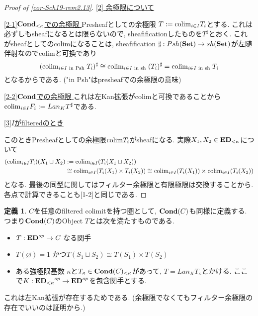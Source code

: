 \documentclass[dvipdfmx,a4paper,11pt]{report}
\newcommand{\colim}{{\rm colim}}
\theoremstyle{definition}
\newtheorem{dfn}[thm]{定義}
\begin{document}
\begin{proof}[Proof of \ref{cor-Sch19-rem2.13}]
\underline{ [2] 余極限について }

\underline{[2-1]${\bf Cond}_{< \kappa}$での余極限 }
Presheafとしての余極限
$T:=\colim_{i \in I}T_i$とする.
 これは必ずしもsheafになるとは限らないので, sheafificationしたものを$T^{\sharp}$とおく.
 これがsheafとしてのcolimになることは, sheafification
 $\sharp : Psh({\bf Set}) \to sh({\bf Set}) $が左随伴射なのでcolimと可換であり
 $$
 (\colim_{i \in I \text{ in Psh }}T_i)^{\sharp} \cong \colim_{i \in I \text{ in sh }}(T_i)^{\sharp}=\colim_{i \in I \text{ in sh }}T_i
 $$
 となるからである. ("in Psh"はpresheafでの余極限の意味)
 
 \underline{[2-2]${\bf Cond}$での余極限 }
 これは左Kan拡張がcolimと可換であることから$\colim_{i \in I}F_i := Lan_{K}T^{\sharp}$である. 

\underline{ [3]$I$がfilteredのとき }
 
このときPresheafとしての余極限$\colim T_i$がsheafになる. 
 実際$X_1, X_2 \in {\bf ED}_{< \kappa}$について
\begin{align*}
\begin{split}
(\colim_{i \in I}T_i)(X_1 \sqcup  X_2 ) 
&:= \colim_{i \in I}(T_i(X_1\sqcup X_2)) \\
&\cong 
\colim_{i \in I}(T_i(X_1)\times T_i( X_2))
\cong
\colim_{i \in I}(T_i(X_1))\times \colim_{i \in I}(T_i( X_2))
\end{split}
\end{align*}
となる. 最後の同型に関してはフィルター余極限と有限極限は交換することから.
 各点で計算できることも[1-2]と同じである. 
\end{proof}

 \begin{tcolorbox}
 [colback = white, colframe = green!35!black, fonttitle = \bfseries,breakable = true]
 \begin{dfn}
$C$を任意のfiltered colimitを持つ圏として, ${\bf Cond}(C)$も同様に定義する.
つまり${\bf Cond}(C)$のObject $T$とは次を満たすものである.
\begin{itemize}
\item $T : {\bf ED}^{op} \to C$ なる関手
\item $T(\varnothing)=1$ かつ$T(S_1\sqcup S_2) \cong T(S_1) \times T(S_2)$
\item ある強極限基数 $\kappa$と$T_{\kappa} \in {\bf Cond}(C)_{< \kappa}$があって, $T = Lan_{K}T_{\kappa}$とかける. ここで$K : {{\bf ED}_{<\kappa}}^{op} \to {\bf ED}^{op}$を包含関手とする.
\end{itemize}

 \end{dfn}
 \end{tcolorbox}
これは左Kan拡張が存在するためである. (余極限でなくてもフィルター余極限の存在でいいのは証明から.)
\end{document}
